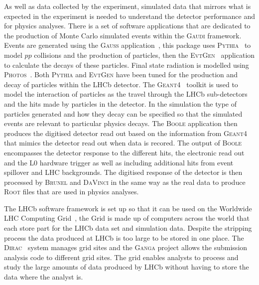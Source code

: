 As well as data collected by the experiment, simulated data that mirrors what is expected in the experiment is needed to understand the detector performance and for physics analyses. There is a set of software applications that are dedicated to the production of Monte Carlo simulated events within the \textsc{Gaudi} framework. Events are generated using the \textsc{Gauss} application~\cite{1742-6596-331-3-032047, Clemencic:2011zza}, this package uses \textsc{Pythia}~\cite{Sjostrand:2006za,Sjostrand:2007gs} to model $pp$ collisions and the production of particles, then the \textsc{Evt}\textsc{Gen}~\cite{Lange:2001uf} application to calculate the decays of these particles. Final state radiation is modelled using \textsc{Photos}~\cite{Golonka:2005pn}. Both \textsc{Pythia} and \textsc{Evt}\textsc{Gen} have been tuned for the production and decay of particles within the LHCb detector. The \textsc{Geant4}~\cite{Agostinelli:2002hh,Allison:2006ve} toolkit is used to model the interaction of particles as the travel through the LHCb sub-detectors and the hits made by particles in the detector. In the simulation the type of particles generated and how they decay can be specified so that the simulated events are relevant to particular physics decays. The \textsc{Boole} application then produces the digitised detector read out based on the information from \textsc{Geant4} that mimics the detector read out when data is recored. The output of \textsc{Boole} encompasses the detector response to the different hits, the electronic read out and the L0 hardware trigger as well as including additional hits from event spillover and LHC backgrounds. The digitised response of the detector is then processed by \textsc{Brunel} and \textsc{DaVinci} in the same way as the real data to produce \textsc{Root} files that are used in physics analyses. %

The LHCb software framework is set up so that it can be used on the Worldwide LHC Computing Grid~\cite{Bird:2011zz, WWCG}, the Grid is made up of computers across the world that each store part for the LHCb data set and simulation data. Despite the stripping process the data produced at LHCb is too large to be stored in one place. The \textsc{Dirac}~\cite{Paterson:1397926} system manages grid sites and the \textsc{Ganga} project allows the submission analysis code to different grid sites. The grid enables analysts to process and study the large amounts of data produced by LHCb without having to store the data where the analyst is. 





